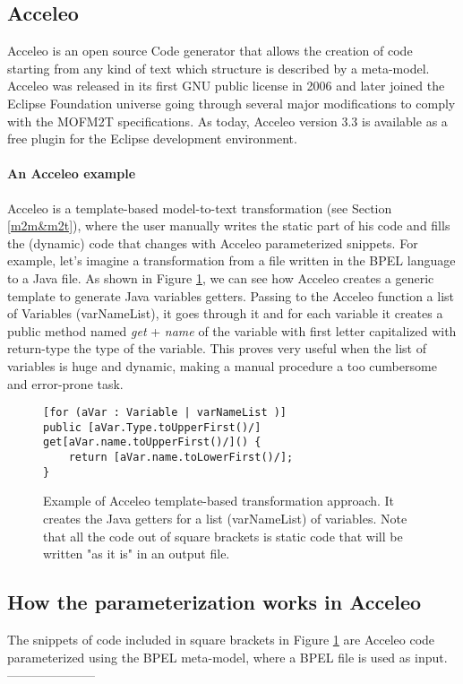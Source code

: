 \subsection{Acceleo}
\label{acceleo}
Acceleo is an open source Code generator that allows the creation of code starting from any kind of text which structure is described by a meta-model. Acceleo was released in its first GNU public license in 2006 and later joined the Eclipse Foundation universe going through several major modifications to comply with the MOFM2T specifications. As today, Acceleo version 3.3 is available as a free plugin for the Eclipse development environment.

\paragraph{An Acceleo example}
Acceleo is a template-based model-to-text transformation (see Section \ref{m2m&m2t}), where the user manually writes the static part of his code and fills the (dynamic) code that changes with Acceleo parameterized snippets.
For example, let's imagine a transformation from a file written in the BPEL language to a Java file. As shown in Figure \ref{AcceleoGettersExample}, we can see how Acceleo creates a generic template to generate Java variables getters. Passing to the Acceleo function a list of Variables (varNameList), it goes through it and for each variable it creates a public method named \textit{get} + \textit{name} of the variable with first letter capitalized with return-type the type of the variable. This proves very useful when the list of variables is huge and dynamic, making a manual procedure a too cumbersome and error-prone task.

\begin{figure}
\caption{Example of Acceleo template-based transformation approach. It creates the Java getters for a list (varNameList) of variables. Note that all the code out of square brackets is static code that will be written "as it is" in an output file.}
\label{AcceleoGettersExample}
\begin{lstlisting}
[for (aVar : Variable | varNameList )]
public [aVar.Type.toUpperFirst()/] get[aVar.name.toUpperFirst()/]() {
	return [aVar.name.toLowerFirst()/];
}
\end{lstlisting}
\end{figure}

\subsection{How the parameterization works in Acceleo}
The snippets of code included in square brackets in Figure \ref{AcceleoGettersExample} are Acceleo code parameterized using the BPEL meta-model, where a BPEL file is used as input. 
---------------------


